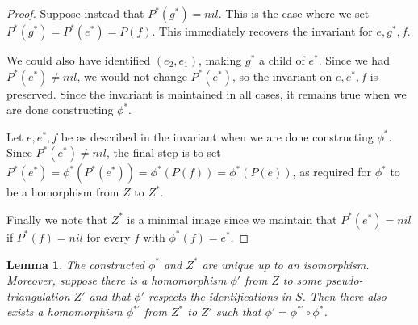 \documentclass[10pt,a4paper]{article}
\newtheorem{lem}[thm]{Lemma}
\def\nil{\textit{nil}}
\begin{document}
\begin{proof}
    Suppose instead that $P^*(g^*)=\nil$. This is the case where we set $P^*(g^*)=P^*(e^*)=P(f)$. This immediately recovers the invariant for $e,g^*,f$.

    We could also have identified
    $(e_2,e_1)$, making $g^*$ a child of $e^*$. Since we had $P^*(e^*)\neq\nil$, 
    we would not change $P^*(e^*)$, so the
    invariant on $e,e^*,f$ is preserved. Since the invariant is maintained in all cases, it remains true when we are done constructing $\phi^*$. 

    Let $e,e^*,f$ be as described in the invariant when we
    are done constructing $\phi^*$. Since
    $P^*(e^*)\neq \nil$, the final step is to set 
    $P^*(e^*)=\phi^*(P^*(e^*))=\phi^*(P(f))=\phi^*(P(e))$, as required for $\phi^*$ to be a homorphism from $Z$ to $Z^*$.

    Finally we note that $Z^*$ is a minimal image since we maintain that  $P^*(e^*)=\nil$ 
    if $P^*(f)=\nil$ for every $f$ with $\phi^*(f)=e^*$.
\end{proof}

\begin{lem}\label{lem:Z*'}
The constructed $\phi^*$ and $Z^*$ are unique up to an isomorphism.
Moreover, suppose there is a homomorphism $\phi'$ from $Z$ to some pseudo-triangulation $Z'$ and that $\phi'$ respects the identifications in $S$.
Then there also exists a homomorphism $\phi^{*\prime}$ from $Z^*$ to $Z'$ such that $\phi' = \phi^{*\prime}\circ\phi^*$. 
\end{lem}
\end{document}
